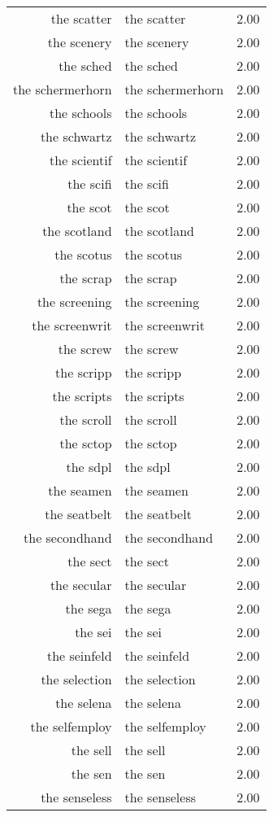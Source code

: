 \begin{table}[ht]
\begin{tabular}{rlr}
  the scatter & the scatter & 2.00 \\ 
  the scenery & the scenery & 2.00 \\ 
  the sched & the sched & 2.00 \\ 
  the schermerhorn & the schermerhorn & 2.00 \\ 
  the schools & the schools & 2.00 \\ 
  the schwartz & the schwartz & 2.00 \\ 
  the scientif & the scientif & 2.00 \\ 
  the scifi & the scifi & 2.00 \\ 
  the scot & the scot & 2.00 \\ 
  the scotland & the scotland & 2.00 \\ 
  the scotus & the scotus & 2.00 \\ 
  the scrap & the scrap & 2.00 \\ 
  the screening & the screening & 2.00 \\ 
  the screenwrit & the screenwrit & 2.00 \\ 
  the screw & the screw & 2.00 \\ 
  the scripp & the scripp & 2.00 \\ 
  the scripts & the scripts & 2.00 \\ 
  the scroll & the scroll & 2.00 \\ 
  the sctop & the sctop & 2.00 \\ 
  the sdpl & the sdpl & 2.00 \\ 
  the seamen & the seamen & 2.00 \\ 
  the seatbelt & the seatbelt & 2.00 \\ 
  the secondhand & the secondhand & 2.00 \\ 
  the sect & the sect & 2.00 \\ 
  the secular & the secular & 2.00 \\ 
  the sega & the sega & 2.00 \\ 
  the sei & the sei & 2.00 \\ 
  the seinfeld & the seinfeld & 2.00 \\ 
  the selection & the selection & 2.00 \\ 
  the selena & the selena & 2.00 \\ 
  the selfemploy & the selfemploy & 2.00 \\ 
  the sell & the sell & 2.00 \\ 
  the sen & the sen & 2.00 \\ 
  the senseless & the senseless & 2.00 \\ 

\end{tabular}
\end{table}

